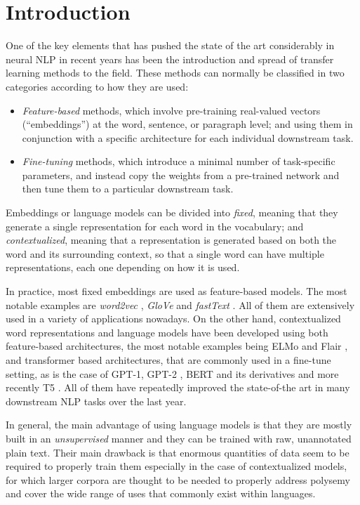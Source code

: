 \section{Introduction}
One of the key elements that has pushed the state of the art considerably in neural NLP in recent years has been the introduction and spread of transfer learning methods to the field. These methods can normally be classified in two categories according to how they are used:
\begin{itemize}
    \item \emph{Feature-based} methods, which involve pre-training real-valued vectors (``embeddings'') at the word, sentence, or paragraph level; and using them in conjunction with a specific architecture for each individual downstream task.
    \item \emph{Fine-tuning} methods, which introduce a minimal number of task-specific parameters, and instead copy the weights from a pre-trained network and then tune them to a particular downstream task.
\end{itemize}
Embeddings or language models can be divided into \emph{fixed}, meaning that they generate a single representation for each word in the vocabulary; and \emph{contextualized}, meaning that a representation is generated based on both the word and its surrounding context, so that a single word can have multiple representations, each one depending on how it is used.

In practice, most fixed embeddings are used as feature-based models. The most notable examples are \emph{word2vec} \citep{mikolov-etal-2013-distributed}, \emph{GloVe} \citep{pennington-etal-2014-glove} and \emph{fastText} \citep{mikolov-etal-2018-advances}. All of them are extensively used in a variety of applications nowadays. On the other hand, contextualized word representations and language models have been developed using both feature-based architectures, the most notable examples being ELMo and Flair \citep{peters-etal-2018-deep,akbik-etal-2018-contextual}, and transformer based architectures, that are commonly used in a fine-tune setting, as is the case of GPT-1, GPT-2 \citep{radford-etal-2018-improving,radford-etal-2019-language}, BERT and its derivatives \citep{devlin-etal-2019-bert,liu-etal-2019-roberta,lan-etal-2020-albert} and more recently T5 \citep{raffel-etal-2020-exploring}. All of them have repeatedly improved the state-of-the art in many downstream NLP tasks over the last year.

In general, the main advantage of using language models is that they are mostly built in an \emph{unsupervised} manner and they can be trained with raw, unannotated plain text. Their main drawback is that enormous quantities of data seem to be required to properly train them especially in the case of contextualized models, for which larger corpora are thought to be needed to properly address polysemy and cover the wide range of uses that commonly exist within languages.

